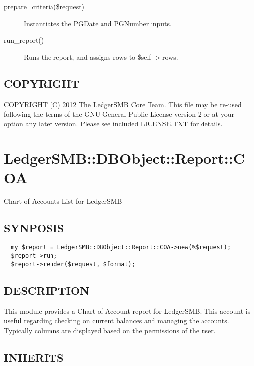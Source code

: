 \begin{description}
\begin{description}
\begin{description}
\begin{description}
\begin{description}
\begin{description}
\begin{description}
\begin{description}
\begin{description}
\begin{description}
\begin{description}
\item[{prepare\_criteria(\$request)}] \mbox{}

Instantiates the PGDate and PGNumber inputs.


\item[{run\_report()}] \mbox{}

Runs the report, and assigns rows to \$self-$>$rows.

\end{description}
\subsection*{COPYRIGHT\label{LedgerSMB::DBObject::Report::GL_COPYRIGHT}}


COPYRIGHT (C) 2012 The LedgerSMB Core Team.  This file may be re-used following
the terms of the GNU General Public License version 2 or at your option any
later version.  Please see included LICENSE.TXT for details.

\section{LedgerSMB::DBObject::Report::COA\label{LedgerSMB::DBObject::Report::COA}}


Chart of Accounts List for LedgerSMB

\subsection*{SYNPOSIS\label{LedgerSMB::DBObject::Report::COA_SYNPOSIS}}
\begin{verbatim}
  my $report = LedgerSMB::DBObject::Report::COA->new(%$request);
  $report->run;
  $report->render($request, $format);
\end{verbatim}
\subsection*{DESCRIPTION\label{LedgerSMB::DBObject::Report::COA_DESCRIPTION}}


This module provides a Chart of Account report for LedgerSMB.  This account is
useful regarding checking on current balances and managing the accounts.
Typically columns are displayed based on the permissions of the user.

\subsection*{INHERITS\label{LedgerSMB::DBObject::Report::COA_INHERITS}}
\begin{description}


\end{description}
\end{description}
\end{description}
\end{description}
\end{description}
\end{description}
\end{description}
\end{description}
\end{description}
\end{description}
\end{description}
